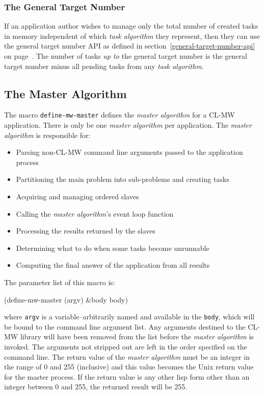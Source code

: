 \documentclass[titlepage,12pt]{book}
\newcommand{\xsmall}{\latexhtml{\small}{}}
\newcommand{\xnormalsize}{\latexhtml{\normalsize}{}}
\newcommand{\clmw}{\xsmall\textsc{CL-MW}\xnormalsize\xspace}
\newcommand{\ma}{\textit{master algorithm}\xspace}
\newcommand{\ta}{\textit{task algorithm}\xspace}
\newcommand{\macro}[1]{\mbox{\texttt{#1}}\xspace}
\newcommand{\var}[1]{\texttt{#1}\xspace}
\begin{document}
\subsubsection{The General Target Number}

If an application author wishes to manage only the total
number of created tasks in memory independent of which \ta
they represent, then they can use the general target number
API as defined in section~\ref{general-target-number-api} on
page~\pageref{general-target-number-api}.  The number of tasks
\textit{up to} the general target number is the general target number
minus all pending tasks from any \ta.

\subsection{\label{master-algorithm}The Master Algorithm}

The macro \macro{define-mw-master} defines the \ma for a \clmw
application. There is only be one \ma per application. The \ma is
responsible for:

\begin{itemize}
\item Parsing non-\clmw command line arguments passed to the application process
\item Partitioning the main problem into sub-problems and creating tasks
\item Acquiring and managing ordered slaves
\item Calling the {\ma}'s event loop function
\item Processing the results returned by the slaves
\item Determining what to do when some tasks become unrunnable
\item Computing the final answer of the application from all results
\end{itemize}

The parameter list of this macro is:

\begin{barelisp}
(define-mw-master (argv) &body body)
\end{barelisp}

where \var{argv} is a variable--arbitrarily named and available in
the \var{body}, which will be bound to the command line argument
list. Any arguments destined to the \clmw library will have been
removed from the list before the \ma is invoked.  The arguments not
stripped out are left in the order specified on the command line.
The return value of the \ma must be an integer in the range of 0 and
255 (inclusive) and this value becomes the Unix return value for the
master process. If the return value is any other lisp form other than
an integer between 0 and 255, the returned result will be 255.
\end{document}
